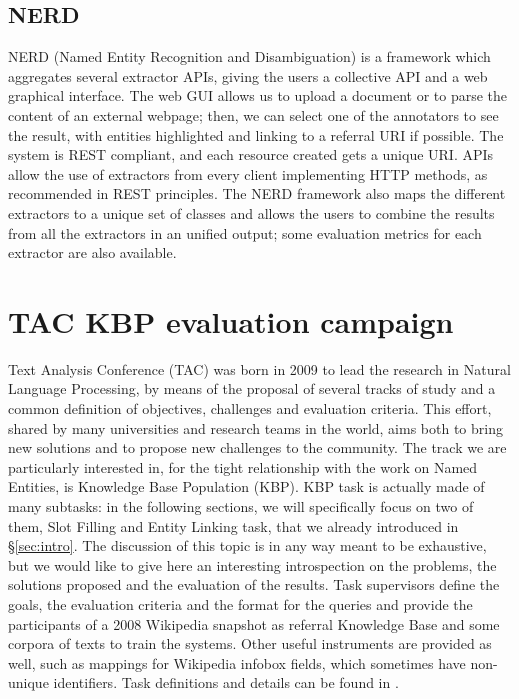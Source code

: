 \documentclass[a4paper,11pt]{report}
\begin{document}
\section{NERD}
NERD (Named Entity Recognition and Disambiguation) \cite{rizzo2012nerd} is a framework which aggregates several extractor APIs, giving the users a collective API and a web graphical interface.
The web GUI allows us to upload a document or to parse the content of an external webpage; then, we can select one of the annotators to see the result, with entities highlighted and linking to a referral URI if possible. The system is REST compliant, and each resource created gets a unique URI. APIs allow the use of extractors from every client implementing HTTP methods, as recommended in REST principles.
The NERD framework also maps the different extractors to a unique set of classes and allows the users to combine the results from all the extractors in an unified output; some evaluation metrics for each extractor are also available.
\chapter{TAC KBP evaluation campaign}
\label{ch:tac}
Text Analysis Conference (TAC) was born in 2009 to lead the research in Natural Language Processing, by means of the proposal of several tracks of study and a common definition of objectives, challenges and evaluation criteria. This effort, shared by many universities and research teams in the world, aims both to bring new solutions and to propose new challenges to the community. The track we are particularly interested in, for the tight relationship with the work on Named Entities, is Knowledge Base Population (KBP).
KBP task is actually made of many subtasks: in the following sections, we will specifically focus on two of them, Slot Filling and Entity Linking task, that we already introduced in \S \ref{sec:intro}. The discussion of this topic is in any way meant to be exhaustive, but we would like to give here an interesting introspection on the problems, the solutions proposed and the evaluation of the results.
Task supervisors define the goals, the evaluation criteria and the format for the queries and provide the participants of a 2008 Wikipedia snapshot as referral Knowledge Base and some corpora of texts to train the systems. Other useful instruments are provided as well, such as mappings for Wikipedia infobox fields, which sometimes have non-unique identifiers.
Task definitions and details can be found in \cite{tac2009, tac2010, tac2011, tac2012}.
\end{document}
